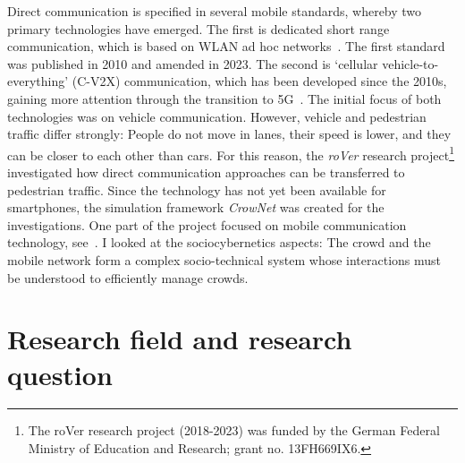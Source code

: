 Direct communication is specified in several mobile standards, whereby two primary technologies have emerged. The first is dedicated short range communication, which is based on WLAN ad hoc networks~\cite{stanley-2023-com}. The first standard was published in 2010 and amended in 2023. The second is `cellular vehicle-to-everything' (C-V2X) communication, which has been developed since the 2010s, gaining more attention through the transition to 5G~\cite{anwar-2019-com}. 
The initial focus of both technologies was on vehicle communication.
However, vehicle and pedestrian traffic differ strongly: People do not move in lanes, their speed is lower, and they can be closer to each other than cars. 
For this reason, 
the \textit{roVer} research project\footnote{The roVer research project (2018-2023) was funded by the German Federal Ministry of Education and Research; grant no. 13FH669IX6. } investigated how direct communication approaches can be transferred to pedestrian traffic. 
Since the technology has not yet been available for smartphones, the simulation framework \textit{CrowNet} was created for the investigations. 
One part of the project focused on mobile communication technology, see~\cite{schuhbaeck-2023-com}. I looked at the sociocybernetics aspects: The crowd and the mobile network form a complex socio-technical system whose interactions must be understood to efficiently manage crowds.






















\section{Research field and research question}



